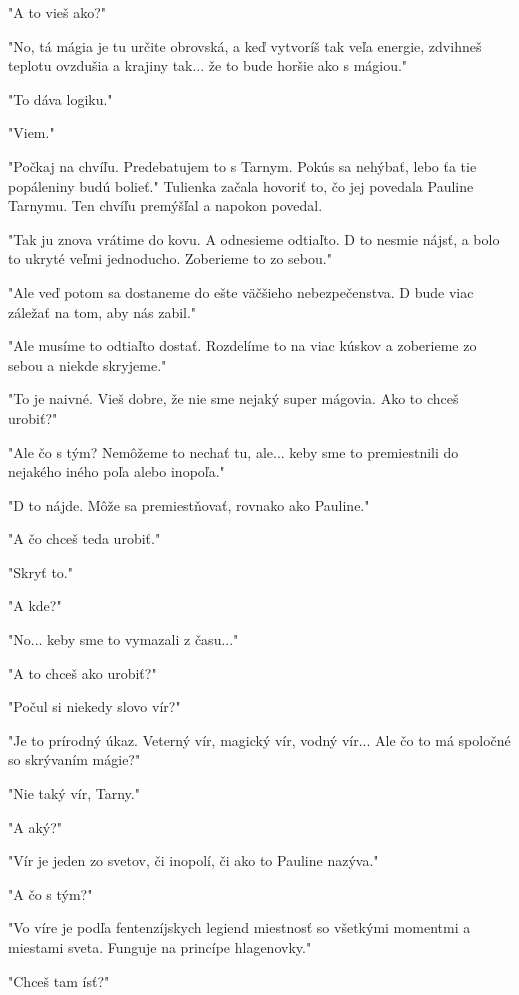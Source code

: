 \documentclass{book}
\begin{document}
"$ $A to vieš ako?"$ $ 

"$ $No, tá mágia je tu určite obrovská, a keď vytvoríš tak veľa energie, zdvihneš teplotu ovzdušia a krajiny tak... že to bude horšie ako s mágiou."$ $ 

"$ $To dáva logiku."$ $ 

"$ $Viem."$ $ 

"$ $Počkaj na chvíľu. Predebatujem to s Tarnym. Pokús sa nehýbať, lebo ťa tie popáleniny budú bolieť."$ $  Tulienka začala hovoriť to, čo jej povedala Pauline Tarnymu. Ten chvíľu premýšľal a napokon povedal.

"$ $Tak ju znova vrátime do kovu. A odnesieme odtiaľto. D to nesmie nájsť, a bolo to ukryté veľmi jednoducho. Zoberieme to zo sebou."$ $ 

"$ $Ale veď potom sa dostaneme do ešte väčšieho nebezpečenstva. D bude viac záležať na tom, aby nás zabil."$ $ 

"$ $Ale musíme to odtiaľto dostať. Rozdelíme to na viac kúskov a zoberieme zo sebou a niekde skryjeme."$ $ 

"$ $To je naivné. Vieš dobre, že nie sme nejaký super mágovia. Ako to chceš urobiť?"$ $ 

"$ $Ale čo s tým? Nemôžeme to nechať tu, ale... keby sme to premiestnili do nejakého iného poľa alebo inopoľa."$ $ 

"$ $D to nájde. Môže sa premiestňovať, rovnako ako Pauline."$ $ 

"$ $A čo chceš teda urobiť."$ $ 

"$ $Skryť to."$ $ 

"$ $A kde?"$ $ 

"$ $No... keby sme to vymazali z času..."$ $ 

"$ $A to chceš ako urobiť?"$ $ 

"$ $Počul si niekedy slovo vír?"$ $ 

"$ $Je to prírodný úkaz. Veterný vír, magický vír, vodný vír... Ale čo to má spoločné so skrývaním mágie?"$ $ 

"$ $Nie taký vír, Tarny."$ $ 

"$ $A aký?"$ $ 

"$ $Vír je jeden zo svetov, či inopolí, či ako to Pauline nazýva."$ $ 

"$ $A čo s tým?"$ $ 

"$ $Vo víre je podľa fentenzíjskych legiend miestnosť so všetkými momentmi a miestami sveta. Funguje na princípe hlagenovky."$ $ 

"$ $Chceš tam ísť?"$ $ 
\end{document}
